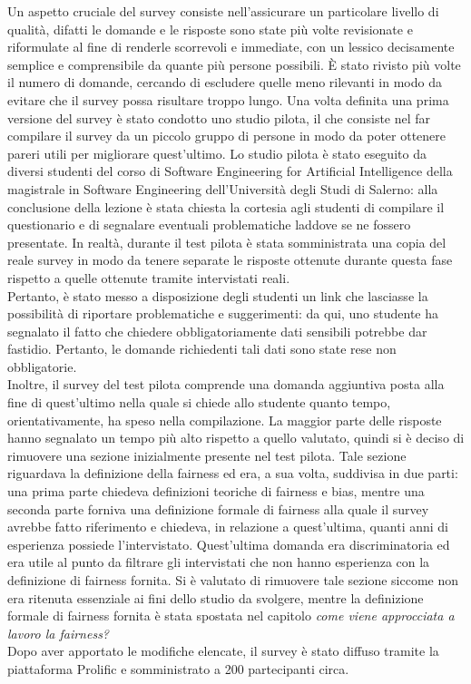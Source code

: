Un aspetto cruciale del survey consiste nell'assicurare un particolare livello di qualità, difatti le domande e le risposte sono state più volte revisionate e riformulate al fine di renderle scorrevoli e immediate, con un lessico decisamente semplice e comprensibile da quante più persone possibili. È stato rivisto più volte il numero di domande, cercando di escludere quelle meno rilevanti in modo da evitare che il survey possa risultare troppo lungo. Una volta definita una prima versione del survey è stato condotto uno studio pilota, il che consiste nel far compilare il survey da un piccolo gruppo di persone in modo da poter ottenere pareri utili per migliorare quest'ultimo. Lo studio pilota è stato eseguito da diversi studenti del corso di Software Engineering for Artificial Intelligence della magistrale in Software Engineering dell'Università degli Studi di Salerno: alla conclusione della lezione è stata chiesta la cortesia agli studenti di compilare il questionario e di segnalare eventuali problematiche laddove se ne fossero presentate. In realtà, durante il test pilota è stata somministrata una copia del reale survey in modo da tenere separate le risposte ottenute durante questa fase rispetto a quelle ottenute tramite intervistati reali.\\
Pertanto, è stato messo a disposizione degli studenti un link che lasciasse la possibilità di riportare problematiche e suggerimenti: da qui, uno studente ha segnalato il fatto che chiedere obbligatoriamente dati sensibili potrebbe dar fastidio. Pertanto, le domande richiedenti tali dati sono state rese non obbligatorie.\\
Inoltre, il survey del test pilota comprende una domanda aggiuntiva posta alla fine di quest'ultimo nella quale si chiede allo studente quanto tempo, orientativamente, ha speso nella compilazione. La maggior parte delle risposte hanno segnalato un tempo più alto rispetto a quello valutato, quindi si è deciso di rimuovere una sezione inizialmente presente nel test pilota. Tale sezione riguardava la definizione della fairness ed era, a sua volta, suddivisa in due parti: una prima parte chiedeva definizioni teoriche di fairness e bias, mentre una seconda parte forniva una definizione formale di fairness alla quale il survey avrebbe fatto riferimento e chiedeva, in relazione a quest'ultima, quanti anni di esperienza possiede l'intervistato. Quest'ultima domanda era discriminatoria ed era utile al punto da filtrare gli intervistati che non hanno esperienza con la definizione di fairness fornita. Si è valutato di rimuovere tale sezione siccome non era ritenuta essenziale ai fini dello studio da svolgere, mentre la definizione formale di fairness fornita è stata spostata nel capitolo \emph{come viene approcciata a lavoro la fairness?}\\
Dopo aver apportato le modifiche elencate, il survey è stato diffuso tramite la piattaforma Prolific e somministrato a 200 partecipanti circa.

